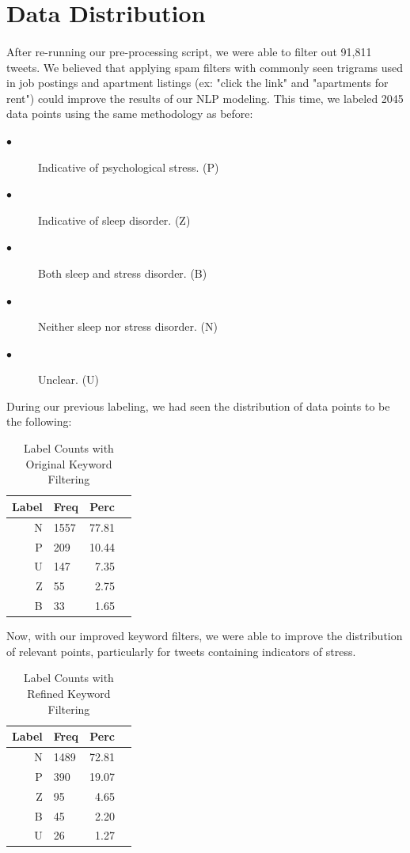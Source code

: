 \documentclass{article}
\begin{document}
\section{Data Distribution}

\paragraph{}
After re-running our pre-processing script, we were able to filter out 91,811 tweets.  We believed that applying spam filters with commonly seen trigrams used in job postings and apartment listings (ex: "click the link" and "apartments for rent") could improve the results of our NLP modeling.  This time, we labeled 2045 data points using the same methodology as before:  

\begin{description}
  \item[$\bullet$ ] Indicative of psychological stress. (P)
  \item[$\bullet$ ] Indicative of sleep disorder. (Z)
  \item[$\bullet$ ] Both sleep and stress disorder.  (B)
  \item[$\bullet$ ] Neither sleep nor stress disorder. (N)
  \item[$\bullet$ ] Unclear. (U)
\end{description}

During our previous labeling, we had seen the distribution of data points to be the following:

\begin{table}[ht]
\caption{Label Counts with Original Keyword Filtering}
\centering
\begin{tabular}{rlrr}
  \hline
  Label & Freq & Perc \\ 
  \hline
  N & 1557 & 77.81 \\ 
   P & 209 & 10.44 \\ 
   U & 147 & 7.35 \\ 
   Z &  55 & 2.75 \\ 
   B &  33 & 1.65 \\ 
   \hline
\end{tabular}
\end{table}

Now, with our improved keyword filters, we were able to improve the distribution of relevant points, particularly for tweets containing indicators of stress. 

\begin{table}[ht]
\caption{Label Counts with Refined Keyword Filtering}
\centering
\begin{tabular}{rlrr}
  \hline
  Label & Freq & Perc \\ 
  \hline
 N & 1489 & 72.81 \\ 
   P & 390 & 19.07 \\ 
   Z &  95 & 4.65 \\ 
   B &  45 & 2.20 \\ 
   U &  26 & 1.27 \\ 
   \hline
\end{tabular}
\end{table}
\end{document}
